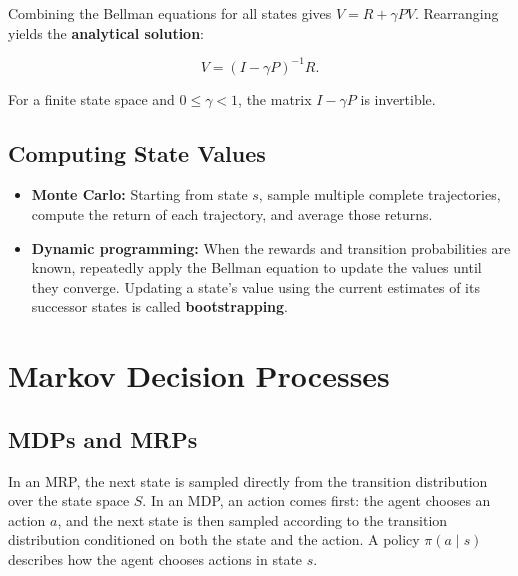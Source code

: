 \documentclass[a4paper,10pt]{article}
\begin{document}
Combining the Bellman equations for all states gives \(V=R+\gamma PV\). Rearranging yields the \textbf{analytical solution}:

\[
V=(I-\gamma P)^{-1}R.
\]

For a finite state space and \(0\le\gamma<1\), the matrix \(I-\gamma P\) is invertible.

\subsection{Computing State Values}

\begin{itemize}
  \item \textbf{Monte Carlo:} Starting from state \(s\), sample multiple complete trajectories, compute the return of each trajectory, and average those returns.
  \item \textbf{Dynamic programming:} When the rewards and transition probabilities are known, repeatedly apply the Bellman equation to update the values until they converge. Updating a state's value using the current estimates of its successor states is called \textbf{bootstrapping}.
\end{itemize}

\section{Markov Decision Processes}

\subsection{MDPs and MRPs}

In an MRP, the next state is sampled directly from the transition distribution over the state space \(S\). In an MDP, an action comes first: the agent chooses an action \(a\), and the next state is then sampled according to the transition distribution conditioned on both the state and the action. A policy \(\pi(a\mid s)\) describes how the agent chooses actions in state \(s\).
\end{document}
